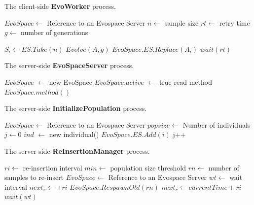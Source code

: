 \begin{algorithm}[t]
\caption{The client-side \textbf{EvoWorker} process.}
\begin{algorithmic}
\REQUIRE $EvoSpace \leftarrow$ Reference to an Evospace Server
\REQUIRE $n \leftarrow$ sample size
\REQUIRE $rt \leftarrow$ retry time
\REQUIRE $g \leftarrow$ number of generations

\STATE $S_i \leftarrow ES.Take(n)$
\STATE $Evolve(A,g)$
\STATE $EvoSpace.ES.Replace(A_i)$
\ELSE
\STATE $wait(rt)$
\ENDIF
\ENDWHILE
\end{algorithmic}
\label{alg:worker}
\end{algorithm}

\begin{algorithm}[t]
\caption{The server-side \textbf{EvoSpaceServer} process.}
\begin{algorithmic}
\STATE $EvoSpace$ $\leftarrow$ new EvoSpace
\STATE $EvoSpace.active$ $\leftarrow$ true
\STATE read method
\RETURN $EvoSpace.method()$
\ENDWHILE
\end{algorithmic}
\label{alg:evoserver}
\end{algorithm}


\begin{algorithm}[t]
\caption{The server-side \textbf{InitializePopulation} process.}
\begin{algorithmic}
\REQUIRE $EvoSpace \leftarrow$ Reference to an Evospace Server
\REQUIRE $popsize \leftarrow$ Number of individuals
\STATE $j \leftarrow 0$
\STATE $ind$ $\leftarrow$ new individual() 
\STATE $EvoSpace.ES.Add(i)$
\STATE j++
\ENDFOR
\end{algorithmic}
\label{alg:population}
\end{algorithm}

\begin{algorithm}[t]
\caption{The server-side \textbf{ReInsertionManager} process.}
\begin{algorithmic}
\REQUIRE $ri \leftarrow$ re-insertion interval
\REQUIRE $min \leftarrow$ population size threshold
\REQUIRE $rn \leftarrow$ number of samples to re-insert
\REQUIRE $EvoSpace \leftarrow$ Reference to an Evospace Server
\REQUIRE $wt \leftarrow$ wait interval
\STATE $next_r \leftarrow +ri$
\STATE $EvoSpace.RespawnOld(rn)$
\STATE $next_r \leftarrow currentTime + ri$
\ENDIF
\STATE $wait(wt)$
\ENDWHILE
\end{algorithmic}
\label{alg:remanager}
\end{algorithm}


